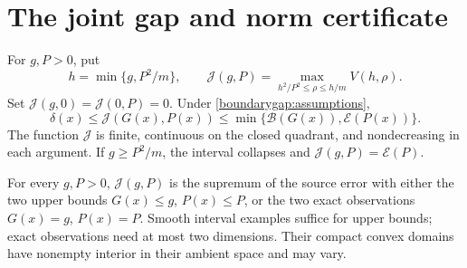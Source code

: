 \section{The joint gap and norm certificate}
\label{joint:section}

\begin{theorem}\label{joint:main}
For $g,P>0$, put
\begin{equation}\label{joint:definition}
 h=\min\{g,P^2/m\},\qquad
 \mathcal J(g,P)=
 \max_{h^2/P^2\le\rho\le h/m}V(h,\rho).
\end{equation}
Set $\mathcal J(g,0)=\mathcal J(0,P)=0$. Under
\eqref{boundarygap:assumptions},
\begin{equation}\label{joint:bound}
 \delta(x)\le\mathcal J(G(x),P(x))
       \le\min\{\mathcal B(G(x)),\mathcal E(P(x))\}.
\end{equation}
The function $\mathcal J$ is finite, continuous on the closed quadrant,
and nondecreasing in each argument. If $g\ge P^2/m$, the interval
collapses and $\mathcal J(g,P)=\mathcal E(P)$.

For every $g,P>0$, $\mathcal J(g,P)$ is the supremum of the source
error with either the two upper bounds $G(x)\le g$, $P(x)\le P$, or
the two exact observations $G(x)=g$, $P(x)=P$. Smooth interval examples
suffice for upper bounds; exact observations need at most two dimensions.
Their compact convex domains have nonempty interior in their ambient space
and may vary.
\end{theorem}


